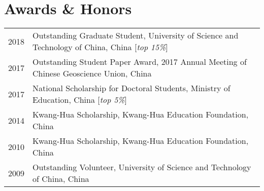 \section*{Awards \& Honors}

\begin{tabular}{p{} p{}}
2018 & Outstanding Graduate Student, University of Science and Technology of China, China [\textit{top 15\%}] \\
2017 & Outstanding Student Paper Award, 2017 Annual Meeting of Chinese Geoscience Union, China \\
2017 & National Scholarship for Doctoral Students, Ministry of Education, China [\textit{top 5\%}] \\
2014 & Kwang-Hua Scholarship, Kwang-Hua Education Foundation, China \\
2010 & Kwang-Hua Scholarship, Kwang-Hua Education Foundation, China \\
2009 & Outstanding Volunteer, University of Science and Technology of China, China \\
\end{tabular}
